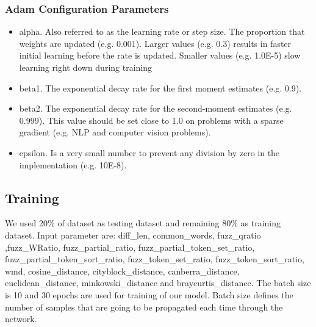 \subsubsection{Adam Configuration Parameters}
\begin{itemize}
\item alpha. Also referred to as the learning rate or step size. The proportion that weights are updated (e.g. 0.001). Larger values (e.g. 0.3) results in faster initial learning before the rate is updated. Smaller values (e.g. 1.0E-5) slow learning right down during training
\item beta1. The exponential decay rate for the first moment estimates (e.g. 0.9).
\item beta2. The exponential decay rate for the second-moment estimates (e.g. 0.999). This value should be set close to 1.0 on problems with a sparse gradient (e.g. NLP and computer vision problems).
\item epsilon. Is a very small number to prevent any division by zero in the implementation (e.g. 10E-8).
\end{itemize}

\subsection{Training}
We used 20\% of dataset as testing dataset and remaining 80\% as training dataset. Input parameter are: diff\_len, common\_words, fuzz\_qratio ,fuzz\_WRatio, fuzz\_partial\_ratio, fuzz\_partial\_token\_set\_ratio, fuzz\_partial\_token\_sort\_ratio, fuzz\_token\_set\_ratio, \newline fuzz\_token\_sort\_ratio, wmd, cosine\_distance, cityblock\_distance, canberra\_distance, euclidean\_distance, minkowski\_distance and braycurtis\_distance. The batch size is 10 and 30 epochs are used for training of our model. Batch size defines the number of samples that are going to be propagated each time through the network.	

